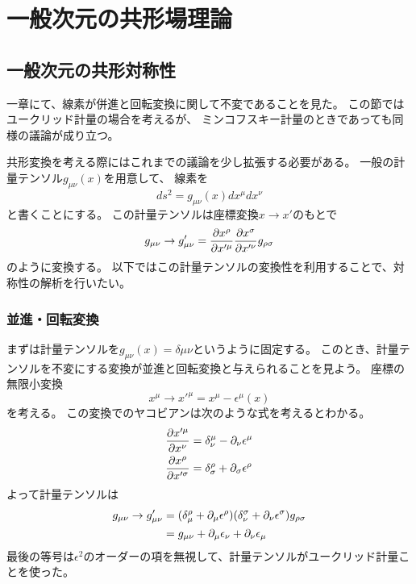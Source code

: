 \documentclass[../../master.tex]{subfiles}
\begin{document}
\setcounter{chapter}{1}
\chapter{一般次元の共形場理論}
\section{一般次元の共形対称性}
一章にて、線素が併進と回転変換に関して不変であることを見た。
この節ではユークリッド計量の場合を考えるが、
ミンコフスキー計量のときであっても同様の議論が成り立つ。

共形変換を考える際にはこれまでの議論を少し拡張する必要がある。
一般の計量テンソル\(g_{\mu\nu}(x)\)を用意して、
線素を
\begin{equation}
    ds^2=g_{\mu\nu}(x)dx^\mu dx^\nu
\end{equation}
と書くことにする。
この計量テンソルは座標変換\(x\rightarrow x'\)のもとで
\begin{equation}
    g_{\mu\nu} \rightarrow g'_{\mu\nu}=\pdv{x^\rho}{x'^\mu} \pdv{x^\sigma}{x'^\nu}g_{\rho\sigma}
\end{equation}
のように変換する。
以下ではこの計量テンソルの変換性を利用することで、対称性の解析を行いたい。

\subsection*{並進・回転変換}
まずは計量テンソルを\(g_{\mu\nu}(x)=\delta{\mu\nu}\)というように固定する。
このとき、計量テンソルを不変にする変換が並進と回転変換と与えられることを見よう。
座標の無限小変換
\begin{equation}
    x^\mu\rightarrow x'^\mu = x^\mu - \epsilon^\mu(x)
\end{equation}
を考える。
この変換でのヤコビアンは次のような式を考えるとわかる。
\begin{align*}
    \pdv{x'^\mu}{x^\nu} &=\delta_\nu^\mu - \partial_\nu\epsilon^\mu\\
    \pdv{x^\rho}{x'^\sigma} &=\delta_\sigma^\rho + \partial_\sigma \epsilon^\rho
\end{align*}
よって計量テンソルは
\begin{align}
    g_{\mu\nu}\rightarrow g'_{\mu\nu}
    &=(\delta_\mu^\rho+\partial_\mu\epsilon^\rho)(\delta_\nu^\sigma+\partial_\nu\epsilon^\sigma)g_{\rho\sigma}\notag\\
    &=g_{\mu\nu} + \partial_\mu\epsilon_\nu + \partial_\nu\epsilon_\mu
\end{align}
最後の等号は\(\epsilon^2\)のオーダーの項を無視して、計量テンソルがユークリッド計量ことを使った。
\end{document}
